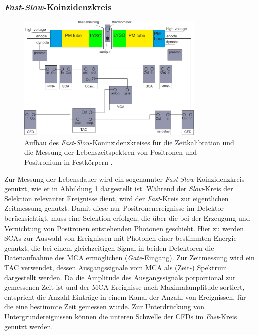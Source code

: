 \documentclass[11pt, a4paper]{article}
\numberwithin{equation}{section}
\begin{document}
\subsubsection{\textit{Fast}-\textit{Slow}-Koinzidenzkreis}
\begin{figure}[h]
	\centering
	\includegraphics[width=0.8\textwidth]{./figures/aufbau/zeit.pdf}
	\caption{Aufbau des \textit{Fast}-\textit{Slow}-Koninzidenzkreises für die Zeitkalibration und die Messung der Lebenszeitspektren von Positronen und Positronium in Festkörpern \cite{anleitung}.}
	\label{fig:fast_slow_coincidence}
\end{figure}

Zur Messung der Lebensdauer wird ein sogenannter \textit{Fast}-\textit{Slow}-Koinzidenzkreis genutzt, wie er in Abbildung \ref{fig:fast_slow_coincidence} dargestellt ist.
Während der \textit{Slow}-Kreis der Selektion relevanter Ereignisse dient, wird der \textit{Fast}-Kreis zur eigentlichen Zeitmessung genutzt.
Damit diese nur Positronenereignisse im Detektor berücksichtigt, muss eine Selektion erfolgen, die über die bei der Erzeugung und Vernichtung von Positronen entstehenden Photonen geschieht.
Hier zu werden SCAs zur Auswahl von Ereignissen mit Photonen einer bestimmten Energie genutzt, die bei einem gleichzeitigen Signal in beiden Detektoren die Datenaufnahme des MCA ermöglichen (\textit{Gate}-Eingang).
Zur Zeitmessung wird ein TAC verwendet, dessen Ausgangssignale vom MCA als (Zeit-) Spektrum dargestellt werden.
Da die Amplitude des Ausgangssignals porportional zur gemessenen Zeit ist und der MCA Ereignisse nach Maximalamplitude sortiert, entspricht die Anzahl Einträge in einem Kanal der Anzahl von Ereignissen, für die eine bestimmte Zeit gemessen wurde.
Zur Unterdrückung von Untergrundereignissen können die unteren Schwelle der CFDs im \textit{Fast}-Kreis genutzt werden.
\end{document}
